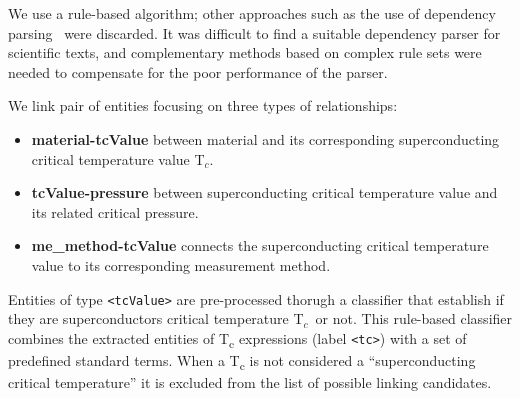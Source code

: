 \documentclass[]{interact}
\theoremstyle{plain}%
\theoremstyle{definition}
\theoremstyle{remark}
\newcommand{\tc}{T$_{c}$}
\begin{document}
We use a rule-based algorithm; other approaches such as the use of dependency parsing~\cite{yoshikawa:2017acl, Tiktinsky2020pyBARTES, swayamdipta:17, zhou-zhao-2019-head} were discarded.
It was difficult to find a suitable dependency parser for scientific texts, and complementary methods based on complex rule sets were needed to compensate for the poor performance of the parser.

We link pair of entities focusing on three types of relationships:
\begin{itemize}
    \item \textbf{material-tcValue} between material and its corresponding superconducting critical temperature value \tc.
    \item \textbf{tcValue-pressure} between superconducting critical temperature value and its related critical pressure.
    \item \textbf{me\_method-tcValue} connects the superconducting critical temperature value to its corresponding measurement method.
\end{itemize}

Entities of type \texttt{<tcValue>} are pre-processed thorugh a classifier that establish if they are superconductors critical temperature \tc~or not.
This rule-based classifier combines the extracted entities of T\textsubscript{c} expressions (label \texttt{<tc>}) with a set of predefined standard terms.
When a T\textsubscript{c} is not considered a ``superconducting critical temperature'' it is excluded from the list of possible linking candidates.
\end{document}
